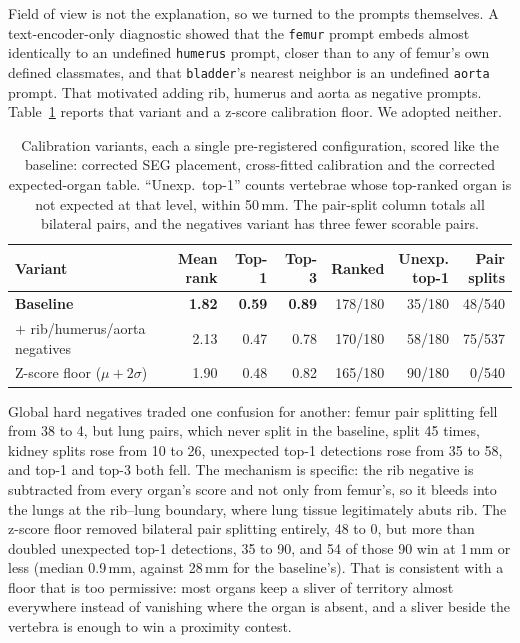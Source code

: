\documentclass[10pt]{article}
\newcommand{\org}[1]{\texttt{#1}}
\begin{document}
Field of view is not the explanation, so we turned to the prompts themselves. A
text-encoder-only diagnostic showed that the \org{femur} prompt embeds almost
identically to an undefined \org{humerus} prompt, closer than to any of femur's
own defined classmates, and that \org{bladder}'s nearest neighbor is an undefined
\org{aorta} prompt. That motivated adding rib, humerus and aorta as negative
prompts. Table~\ref{tab:variants} reports that variant and a z-score calibration
floor. We adopted neither.

\begin{table}[!htbp]
\centering
\small
\caption{Calibration variants, each a single pre-registered configuration, scored
like the baseline: corrected SEG placement, cross-fitted calibration and the
corrected expected-organ table. ``Unexp.\ top-1'' counts vertebrae whose top-ranked
organ is not expected at that level, within 50\,mm. The pair-split column totals
all bilateral pairs, and the negatives variant has three fewer scorable pairs.}
\label{tab:variants}
\begin{tabular}{@{}lrrrrrr@{}}
\toprule
Variant & \makecell{Mean\\rank} & Top-1 & Top-3 & Ranked & \makecell{Unexp.\\top-1} & \makecell{Pair\\splits} \\
\midrule
\textbf{Baseline} & \textbf{1.82} & \textbf{0.59} & \textbf{0.89} & 178/180 & 35/180 & 48/540 \\
$+$ rib/humerus/aorta negatives & 2.13 & 0.47 & 0.78 & 170/180 & 58/180 & 75/537 \\
Z-score floor ($\mu + 2\sigma$) & 1.90 & 0.48 & 0.82 & 165/180 & 90/180 & 0/540 \\
\bottomrule
\end{tabular}
\end{table}

Global hard negatives traded one confusion for another: femur pair splitting fell
from 38 to 4, but lung pairs, which never split in the baseline, split 45 times,
kidney splits rose from 10 to 26, unexpected top-1 detections rose from 35 to 58,
and top-1 and top-3 both fell. The mechanism is specific: the rib negative is
subtracted from every organ's score and not only from femur's, so it bleeds into
the lungs at the rib--lung boundary, where lung tissue legitimately abuts rib. The
z-score floor removed bilateral pair splitting entirely, 48 to 0, but more than
doubled unexpected top-1 detections, 35 to 90, and 54 of those 90 win at 1\,mm or
less (median 0.9\,mm, against 28\,mm for the baseline's). That is consistent with a
floor that is too permissive: most organs keep a sliver of territory almost
everywhere instead of vanishing where the organ is absent, and a sliver beside the
vertebra is enough to win a proximity contest.
\end{document}
